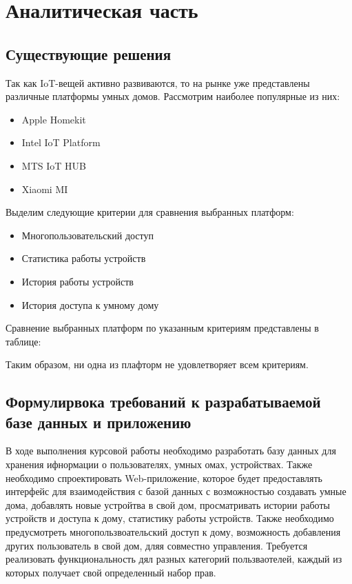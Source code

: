 \chapter{Аналитическая часть}

\section{Существующие решения}

Так как IoT-вещей активно развиваются, то на рынке уже представлены различные платформы умных домов. 
Рассмотрим наиболее популярные из них:
\begin{itemize}
    \item Apple Homekit
    \item Intel IoT Platform
    \item MTS IoT HUB
    \item Xiaomi MI
\end{itemize}

Выделим следующие критерии для сравнения выбранных платформ:
\begin{itemize}
    \item Многопользовательский доступ
    \item Статистика работы устройств
    \item История работы устройств
    \item История доступа к умному дому
\end{itemize}

Сравнение выбранных платформ по указанным критериям представлены в таблице:



Таким образом, ни одна из плафторм не удовлетворяет всем критериям. 

\section{Формулирвока требований к разрабатываемой базе данных и приложению}

В ходе выполнения курсовой работы необходимо разработать базу данных для хранения ифнормации 
о пользователях, умных омах, устройствах. Также необходимо спроектировать Web-приложение, 
которое будет предоставлять интерфейс для взаимодействия с базой данных с возможностью создавать умные дома, 
добавлять новые устройтва в свой дом, просматривать истории работы устройств и доступа
к дому, статистику работы устройств.
    Также необходимо предусмотреть многопользвоательский доступ к дому, возможность добавления других пользователь 
в свой дом, дляя совместно управления. Требуется реализовать функциональность дял разных категорий пользваотелей, 
каждый из которых получает свой определенный набор прав.

